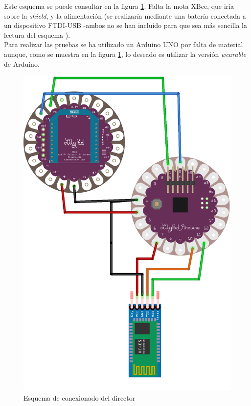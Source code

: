Este esquema se puede consultar en la figura \ref{fig:director_esquema}. Falta
la mota XBee, que iría sobre la \textit{shield}, y la alimentación (se realizaría mediante una batería conectada a
un dispositivo FTDI-USB -ambos no se han incluido para que sea más sencilla la lectura del
esquema-).\\

Para realizar las pruebas se ha utilizado un Arduino UNO por falta de material aunque,
como se muestra en la figura \ref{fig:director_esquema}, lo deseado es utilizar la
versión \textit{wearable} de Arduino.

\begin{figure}[!htb]
\centering
\includegraphics[width=1\textwidth]{./imagenes/director_esquema}
\caption{Esquema de conexionado del director} \label{fig:director_esquema}
\end{figure}

